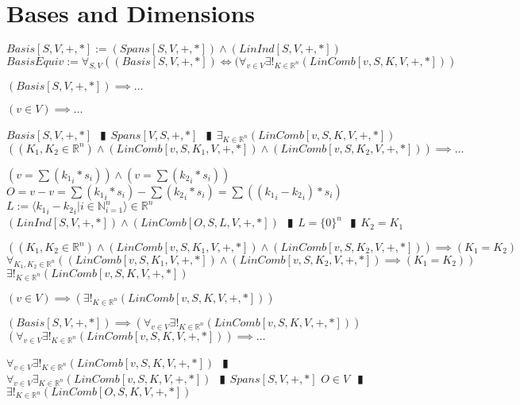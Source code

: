 \documentclass{book}
\newcommand{\abr}{:=}
\newcommand{\pipe}{$\phantom{(}\vrectangleblack\phantom{)}$}
\newcommand{\pr}[1]{\left(#1\right)}
\begin{document}
\section{Bases and Dimensions}
$Basis[S, V, +, *] \abr (Spans[S, V, +, *]) \land (LinInd[S, V, +, *])$ \\

$BasisEquiv \abr \forall_{S, V}\pr{(Basis[S, V, +, *]) \iff (\forall_{v \in V} \exists!_{K \in \mathbb{R}^n}(LinComb[v, S, K, V, +, *])}$
\begin{enumerate}
  \lit $(Basis[S, V, +, *]) \implies \ldots$
  \begin{enumerate}
    \lit $(v \in V) \implies \ldots$
    \begin{enumerate}
      \lit $Basis[S, V, +, *]$ \pipe $Spans[V, S, +, *]$ \pipe $\exists_{K \in \mathbb{R}^n}(LinComb[v, S, K, V, +, *])$
      \lit $\pr{(K_1, K_2 \in \mathbb{R}^n) \land (LinComb[v, S, K_1, V, +, *]) \land (LinComb[v, S, K_2, V, +, *])} \implies \ldots$
      \begin{enumerate}
        \lit $\pr{v = \sum({k_1}_i * s_i)} \land \pr{v = \sum({k_2}_i * s_i)}$
        \lit $O = v - v = \sum({k_1}_i * s_i) - \sum({k_2}_i * s_i) = \sum\pr{({k_1}_i - {k_2}_i) * s_i}$
        \lit $L \abr \langle {k_1}_i - {k_2}_i | i \in \mathbb{N}_{i = 1}^n \rangle \in \mathbb{R}^n$
        \lit $(LinInd[S, V, +, *]) \land (LinComb[O, S, L, V, +, *])$ \pipe $L = \{0\}^n$ \pipe $K_2 = K_1$
      \end{enumerate}
      \lit $\pr{(K_1, K_2 \in \mathbb{R}^n) \land (LinComb[v, S, K_1, V, +, *]) \land (LinComb[v, S, K_2, V, +, *])} \implies (K_1 = K_2)$
      \lit $\forall_{K_1, K_2 \in \mathbb{R}^n}\pr{(LinComb[v, S, K_1, V, +, *]) \land (LinComb[v, S, K_2, V, +, *]) \implies (K_1 = K_2)}$
      \lit $\exists!_{K \in \mathbb{R}^n}(LinComb[v, S, K, V, +, *])$
    \end{enumerate}
    \lit $(v \in V) \implies \pr{\exists!_{K \in \mathbb{R}^n}(LinComb[v, S, K, V, +, *])}$
    \end{enumerate}
  \lit $(Basis[S, V, +, *]) \implies \pr{\forall_{v \in V} \exists!_{K \in \mathbb{R}^n}(LinComb[v, S, K, V, +, *])}$
  \lit $\pr{\forall_{v \in V} \exists!_{K \in \mathbb{R}^n}(LinComb[v, S, K, V, +, *])} \implies \ldots$
  \begin{enumerate}
    \lit $\forall_{v \in V} \exists!_{K \in \mathbb{R}^n}(LinComb[v, S, K, V, +, *])$ \pipe $\forall_{v \in V} \exists_{K \in \mathbb{R}^n}(LinComb[v, S, K, V, +, *])$ \pipe $Spans[S, V, +, *]$
    \lit $O \in V$ \pipe $\exists!_{K \in \mathbb{R}^n}(LinComb[O, S, K, V, +, *])$

\end{enumerate}
\end{enumerate}
\end{document}
